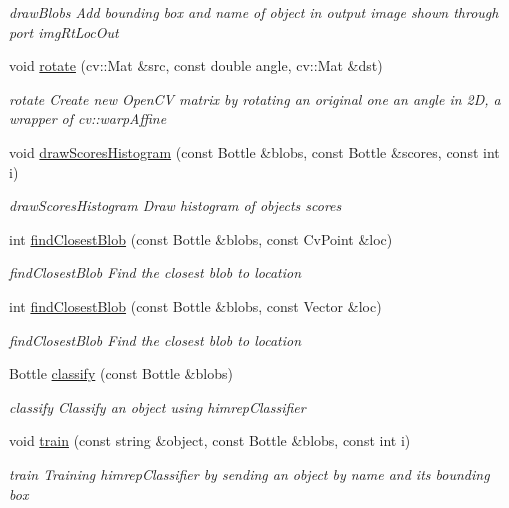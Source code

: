 \begin{DoxyCompactItemize}
\begin{DoxyCompactList}\small\item\em draw\+Blobs Add bounding box and name of object in output image shown through port img\+Rt\+Loc\+Out \end{DoxyCompactList}\item 
void \hyperlink{group__iol2opc_ab89714358f38a76b5638ad0ac6b40c4f}{rotate} (cv\+::\+Mat \&src, const double angle, cv\+::\+Mat \&dst)
\begin{DoxyCompactList}\small\item\em rotate Create new Open\+CV matrix by rotating an original one an angle in 2D, a wrapper of cv\+::warp\+Affine \end{DoxyCompactList}\item 
void \hyperlink{group__iol2opc_aa496db72603bd88317ba47e1229167c0}{draw\+Scores\+Histogram} (const Bottle \&blobs, const Bottle \&scores, const int i)
\begin{DoxyCompactList}\small\item\em draw\+Scores\+Histogram Draw histogram of objects\textquotesingle{} scores \end{DoxyCompactList}\item 
int \hyperlink{group__iol2opc_ab8eebf53c05431d054bf6d44319cf706}{find\+Closest\+Blob} (const Bottle \&blobs, const Cv\+Point \&loc)
\begin{DoxyCompactList}\small\item\em find\+Closest\+Blob Find the closest blob to location \end{DoxyCompactList}\item 
int \hyperlink{group__iol2opc_aae4d9ebe5591b73728e105ed0dc859ff}{find\+Closest\+Blob} (const Bottle \&blobs, const Vector \&loc)
\begin{DoxyCompactList}\small\item\em find\+Closest\+Blob Find the closest blob to location \end{DoxyCompactList}\item 
Bottle \hyperlink{group__iol2opc_a372d6a1015753163ed2fc7fa1838bff5}{classify} (const Bottle \&blobs)
\begin{DoxyCompactList}\small\item\em classify Classify an object using himrep\+Classifier \end{DoxyCompactList}\item 
void \hyperlink{group__iol2opc_a8363a7dd5c259d30d97f04cb15aa9a96}{train} (const string \&object, const Bottle \&blobs, const int i)
\begin{DoxyCompactList}\small\item\em train Training himrep\+Classifier by sending an object by name and its bounding box \end{DoxyCompactList}\item 

\end{DoxyCompactItemize}
